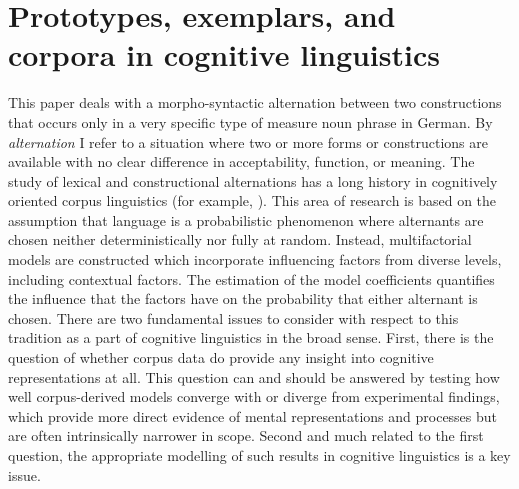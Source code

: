 \section{Prototypes, exemplars, and corpora in cognitive linguistics}
\label{sec:cogocl}

This paper deals with a morpho-syntactic alternation between two constructions that occurs only in a very specific type of measure noun phrase in German.
By \textit{alternation} I refer to a situation where two or more forms or constructions are available with no clear difference in acceptability, function, or meaning.
The study of lexical and constructional alternations has a long history in cognitively oriented corpus linguistics (for example, \citealp{BresnanEa2007,BresnanHay2010,BresnanFord2010,DivjakArppe2013,Gries2015,NessetJanda2010,Wulff2003}).
This area of research is based on the assumption that language is a probabilistic phenomenon \citep{Bresnan2007} where alternants are chosen neither deterministically nor fully at random.
Instead, multifactorial models are constructed which incorporate influencing factors from diverse levels, including contextual factors.
The estimation of the model coefficients quantifies the influence that the factors have on the probability that either alternant is chosen.
There are two fundamental issues to consider with respect to this tradition as a part of cognitive linguistics in the broad sense.
First, there is the question of whether corpus data do provide any insight into cognitive representations at all.
This question can and should be answered by testing how well corpus-derived models converge with or diverge from experimental findings, which provide more direct evidence of mental representations and processes but are often intrinsically narrower in scope.
Second and much related to the first question, the appropriate modelling of such results in cognitive linguistics is a key issue.

